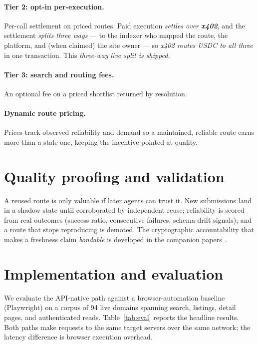 \documentclass[11pt]{article}
\begin{document}
\paragraph{Tier 2: opt-in per-execution.} Per-call settlement on priced routes.
Paid execution \emph{settles over \textbf{x402}}, and the settlement \emph{splits
three ways} --- to the indexer who mapped the route, the platform, and (when
claimed) the site owner --- so \emph{x402 routes USDC to all three} in one
transaction. This \emph{three-way live split is shipped}.
\paragraph{Tier 3: search and routing fees.} An optional fee on a priced shortlist
returned by resolution.
\paragraph{Dynamic route pricing.} Prices track observed reliability and demand so
a maintained, reliable route earns more than a stale one, keeping the incentive
pointed at quality.

\section{Quality proofing and validation}
A reused route is only valuable if later agents can trust it. New submissions land
in a shadow state until corroborated by independent reuse; reliability is scored
from real outcomes (success ratio, consecutive failures, schema-drift signals); and
a route that stops reproducing is demoted. The cryptographic accountability that
makes a freshness claim \emph{bondable} is developed in the companion
papers~\cite{security,maintenance}.

\section{Implementation and evaluation}
We evaluate the API-native path against a browser-automation baseline (Playwright)
on a corpus of 94 live domains spanning search, listings, detail pages, and
authenticated reads. Table~\ref{tab:eval} reports the headline results. Both paths
make requests to the same target servers over the same network; the latency
difference is browser execution overhead.
\end{document}
